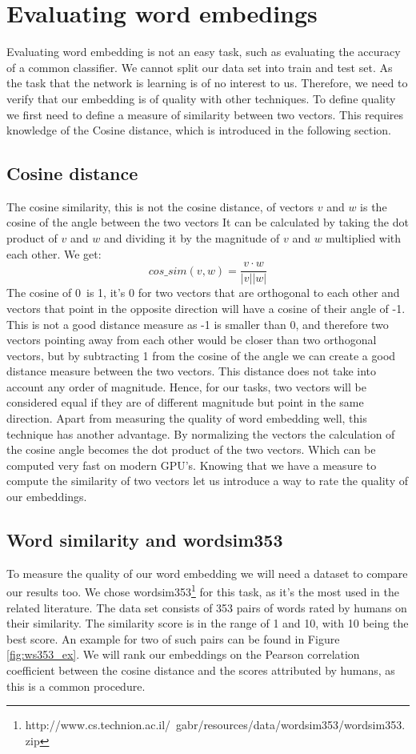 \section{Evaluating word embedings}
Evaluating word embedding is not an easy task, such as evaluating the accuracy of a common classifier. We cannot split our data set into train and test set. As the task that the network is learning is of no interest to us. Therefore, we need to verify that our embedding is of quality with other techniques. To define quality we first need to define a measure of similarity between two vectors. This requires knowledge of the Cosine distance, which is introduced in the following section.
\subsection{Cosine distance}
The cosine similarity, this is not the cosine distance, of vectors $v$ and $w$ is the cosine of the angle between the two vectors It can be calculated by taking the dot product of $v$ and $w$ and dividing it by the magnitude of $v$ and $w$ multiplied with each other. We get:
\begin{equation}
cos\_sim(v,w) = \frac{v \cdot w}{|v| |w|}
\end{equation}
The cosine of 0\textdegree ~is 1, it's 0 for two vectors that are orthogonal to each other and vectors that point in the opposite direction will have a cosine of their angle of -1. This is not a good distance measure as -1 is smaller than 0, and therefore two vectors pointing away from each other would be closer than two orthogonal vectors, but by subtracting 1 from the cosine of the angle we can create a good distance measure between the two vectors. This distance does not take into account any order of magnitude. Hence, for our tasks, two vectors will be considered equal if they are of different magnitude but point in the same direction.
Apart from measuring the quality of word embedding well, this technique has another advantage. By normalizing the vectors the calculation of the cosine angle becomes the dot product of the two vectors. Which can be computed very fast on modern GPU's.
Knowing that we have a measure to compute the similarity of two vectors let us introduce a way to rate the quality of our embeddings.

\subsection{Word similarity and wordsim353}
To measure the quality of our word embedding we will need a dataset to compare our results too. We chose wordsim353\footnote{http://www.cs.technion.ac.il/~gabr/resources/data/wordsim353/wordsim353.zip} for this task, as it's the most used in the related literature. The data set consists of 353 pairs of words rated by humans on their similarity. The similarity score is in the range of 1 and 10, with 10 being the best score. An example for two of such pairs can be found in Figure \ref{fig:ws353_ex}. We will rank our embeddings on the Pearson correlation coefficient between the cosine distance and the scores attributed by humans, as this is a common procedure.

